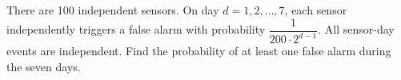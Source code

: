 There are 100 independent sensors. On day $d=1,2,\ldots,7$, each sensor independently triggers a false alarm with probability $\dfrac{1}{200\cdot2^{d-1}}$. All sensor-day events are independent. Find the probability of at least one false alarm during the seven days.
